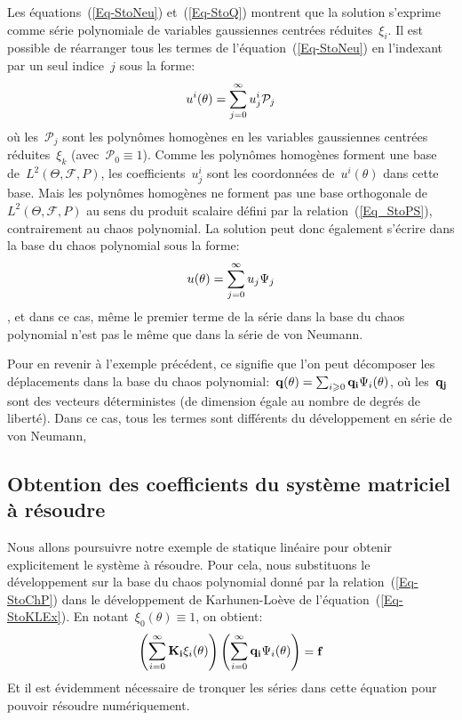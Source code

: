Les équations~(\ref{Eq-StoNeu}) et~(\ref{Eq-StoQ}) montrent que la solution s'exprime comme série polynomiale de variables gaussiennes centrées réduites~$\xi_i$. 
Il est possible de réarranger tous les termes de l'équation~(\ref{Eq-StoNeu}) en l'indexant par un seul indice~$j$ sous la forme:
\begin{equation}
u^i(\theta)=\displaystyle\sum_{j=0}^\infty u_j^i\mathcal{P}_j
\end{equation}
où les~$\mathcal{P}_j$ sont les polynômes homogènes en les variables gaussiennes centrées réduites~$\xi_k$ (avec~$\mathcal{P}_0\equiv1$).
Comme les polynômes homogènes forment une base de~$L^2(\Theta,\mathcal{F},P)$, les coefficients~$u_j^i$ sont les coordonnées de~$u^i(\theta)$ dans cette base.
Mais les polynômes homogènes ne forment pas une base orthogonale de~$L^2(\Theta,\mathcal{F},P)$ au sens du produit scalaire défini par la relation~(\ref{Eq_StoPS}), contrairement au chaos polynomial. 
La solution peut donc également s'écrire dans la base du chaos polynomial sous la forme:
\begin{equation}\label{Eq-StoChP}
u(\theta)=\displaystyle\sum_{j=0}^\infty u_j\Psi_j
\end{equation}
, et dans ce cas, même le premier terme de la série dans la base du chaos polynomial n'est pas le même que dans la série de von Neumann.

\medskip
Pour en revenir à l'exemple précédent, ce signifie que l'on peut décomposer les déplacements dans la base du chaos polynomial:~$\VV{q(\theta)}=\sum_{i\ge0}\VV{q_i}\Psi_i(\theta)$, où les~$\VV{q_j}$ sont des vecteurs déterministes (de dimension égale au nombre de degrés de liberté). 
Dans ce cas, tous les termes sont différents du développement en série de von Neumann, 

\medskip
\subsection{Obtention des coefficients du système matriciel à résoudre}

Nous allons poursuivre notre exemple de statique linéaire pour obtenir explicitement le système à résoudre.
Pour cela, nous substituons le développement sur la base du chaos polynomial donné par la relation~(\ref{Eq-StoChP}) dans le développement de Karhunen-Loève de l'équation~(\ref{Eq-StoKLEx}). En notant~$\xi_0(\theta)\equiv1$, on obtient:
\begin{equation}\label{Eq-StoEFEx}
\PP{\dsum_{i=0}^\infty \MM{K_i}\xi_i(\theta)}\PP{\dsum_{i=0}^\infty \VV{q_i}\Psi_i(\theta)} = \VV{f}
\end{equation}
Et il est évidemment nécessaire de tronquer les séries dans cette équation pour pouvoir résoudre numériquement.

